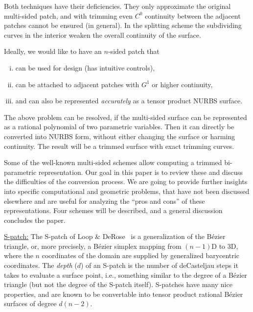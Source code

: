 \documentclass{article}
\begin{document}
Both techniques have their deficiencies. They only approximate the original multi-sided
patch, and with trimming even $C^0$ continuity between the adjacent patches cannot be
ensured (in general). In the splitting scheme the subdividing curves in the interior
weaken the overall continuity of the surface.

Ideally, we would like to have an $n$-sided patch that
\begin{enumerate}[i)]
\item can be used for design (has intuitive controls),
\item can be attached to adjacent patches with $G^1$ or higher continuity,
\item and can also be represented \emph{accurately} as a tensor product NURBS surface.
\end{enumerate}

The above problem can be resolved, if the multi-sided surface can be represented as a
rational polynomial of two parametric variables. Then it can directly be converted into
NURBS form, without either changing the surface or harming continuity. The result will be
a trimmed surface with exact trimming curves.
 
Some of the well-known multi-sided schemes allow computing a trimmed bi-parametric
representation. Our goal in this paper is to review these and discuss the difficulties of
the conversion process. We are going to provide further insights into specific
computational and geometric problems, that have not been discussed elsewhere and are
useful for analyzing the ``pros and cons'' of these representations. Four schemes will be
described, and a general discussion concludes the paper.

\vspace{10pt}
\noindent\underline{S-patch:}\vspace{0.2em}\newline
The S-patch of Loop \& DeRose~\cite{spatch1} is a generalization of the B\'ezier triangle, or,
more precisely, a B\'ezier simplex mapping from $(n-1)$D to 3D, where the $n$ coordinates of the
domain are supplied by generalized barycentric coordinates. The \emph{depth} ($d$) of an S-patch
is the number of deCasteljau steps it takes to evaluate a surface point, i.e., something similar
to the degree of a B\'ezier triangle (but not the degree of the S-patch itself).
S-patches have many nice properties, and are known to be convertable into tensor product
rational B\'ezier surfaces of degree $d(n-2)$.
\end{document}
